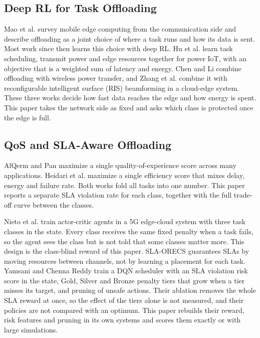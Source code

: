 \documentclass[journal]{IEEEtran}
\begin{document}
\subsection{Deep RL for Task Offloading}
Mao et al. \cite{mao2017} survey mobile edge computing from the communication side and describe offloading as a joint choice of where a task runs and how its data is sent. Most work since then learns this choice with deep RL. Hu et al. \cite{hu2021} learn task scheduling, transmit power and edge resources together for power IoT, with an objective that is a weighted sum of latency and energy. Chen and Li \cite{chen2025} combine offloading with wireless power transfer, and Zhang et al. \cite{zhang2024} combine it with reconfigurable intelligent surface (RIS) beamforming in a cloud-edge system. These three works decide how fast data reaches the edge and how energy is spent. This paper takes the network side as fixed and asks which class is protected once the edge is full.

\subsection{QoS and SLA-Aware Offloading}
AlQerm and Pan \cite{alqerm2021} maximize a single quality-of-experience score across many applications. Heidari et al. \cite{heidari2023} maximize a single efficiency score that mixes delay, energy and failure rate. Both works fold all tasks into one number. This paper reports a separate SLA violation rate for each class, together with the full trade-off curve between the classes.

Nieto et al. \cite{nieto2024} train actor-critic agents in a 5G edge-cloud system with three task classes in the state. Every class receives the same fixed penalty when a task fails, so the agent sees the class but is not told that some classes matter more. This design is the class-blind reward of this paper. SLA-ORECS \cite{lan2024} guarantees SLAs by moving resources between channels, not by learning a placement for each task. Yamsani and Chenna Reddy \cite{yamsani2026} train a DQN scheduler with an SLA violation risk score in the state, Gold, Silver and Bronze penalty tiers that grow when a tier misses its target, and pruning of unsafe actions. Their ablation removes the whole SLA reward at once, so the effect of the tiers alone is not measured, and their policies are not compared with an optimum. This paper rebuilds their reward, risk features and pruning in its own systems and scores them exactly or with large simulations.
\end{document}
